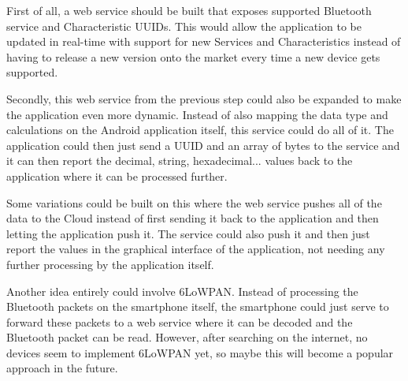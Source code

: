\documentclass[pdftex,a4paper,12pt,twoside]{report}
\begin{document}
First of all, a web service should be built that exposes supported Bluetooth service and Characteristic UUIDs. This would allow the application to be updated in real-time with support for new Services and Characteristics instead of having to release a new version onto the market every time a new device gets supported.

Secondly, this web service from the previous step could also be expanded to make the application even more dynamic. Instead of also mapping the data type and calculations on the Android application itself, this service could do all of it. The application could then just send a UUID and an array of bytes to the service and it can then report the decimal, string, hexadecimal... values back to the application where it can be processed further.

Some variations could be built on this where the web service pushes all of the data to the Cloud instead of first sending it back to the application and then letting the application push it. The service could also push it and then just report the values in the graphical interface of the application, not needing any further processing by the application itself.

Another idea entirely could involve 6LoWPAN. Instead of processing the Bluetooth packets on the smartphone itself, the smartphone could just serve to forward these packets to a web service where it can be decoded and the Bluetooth packet can be read. However, after searching on the internet, no devices seem to implement 6LoWPAN yet, so maybe this will become a popular approach in the future.





\listoffigures
\listoftables
\end{document}
